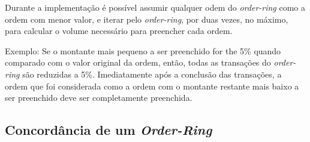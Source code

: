 \documentclass[UTF8,nofonts]{article}
\makeatletter
\newenvironment{figurehere}
 {\def\@captype{figure}}
 {}
\makeatother
\begin{document}
\begin{multicols}{2}
\begin{enumerate}
Durante a implementação é possível assumir qualquer odem do \textit{order-ring} como a ordem com menor valor, e iterar pelo \textit{order-ring}, por duas vezes, no máximo, para calcular o volume necessário para preencher cada ordem.


Exemplo: Se o montante mais pequeno a ser preenchido for the 5\% quando comparado com o valor original da ordem, então, todas as transações do \textit{order-ring} são reduzidas a 5\%. Imediatamente após a conclusão das transações, a ordem que foi considerada como a ordem com o montante restante mais baixo a ser preenchido deve  ser completamente preenchida.


\subsection{Concordância de um \textit{Order-Ring}}



\begin{center}
\begin{figurehere}
\centering
{}
\end{figurehere}
\end{center}
\end{enumerate}
\end{multicols}
\end{document}
